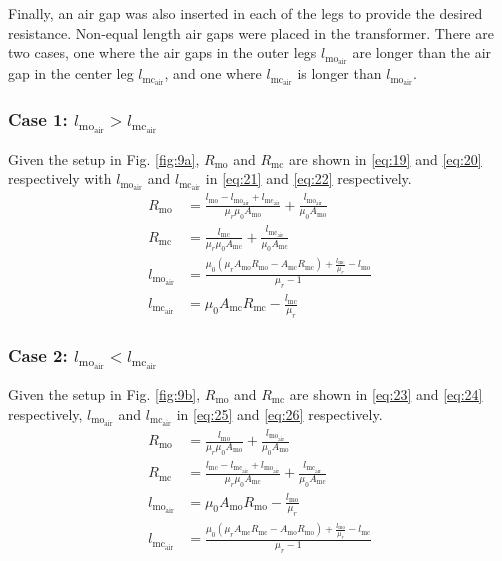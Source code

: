 \documentclass[lettersize,journal]{IEEEtran}
\begin{document}
Finally, an air gap was also inserted in each of the legs to provide the desired resistance. Non-equal length air gaps were placed in the transformer. There are two cases, one where the air gaps in the outer legs $l_{\mathrm{mo}_{\mathrm{air}}}$ are longer than the air gap in the center leg $l_{\mathrm{mc}_{\mathrm{air}}}$, and one where $l_{\mathrm{mc}_{\mathrm{air}}}$ is longer than $l_{\mathrm{mo}_{\mathrm{air}}}$.

\subsubsection*{\textup{Case 1: $l_{\mathrm{mo}_{\mathrm{air}}} > l_{\mathrm{mc}_{\mathrm{air}}}$}}
Given the setup in Fig. \ref{fig:9a}, $R_{\mathrm{mo}}$ and $R_{\mathrm{mc}}$ are shown in \eqref{eq:19} and \eqref{eq:20} respectively with $l_{\mathrm{mo}_{\mathrm{air}}}$ and $l_{\mathrm{mc}_{\mathrm{air}}}$ in \eqref{eq:21} and \eqref{eq:22} respectively.  
\begin{align}
R_{\mathrm{mo}} &= \frac{l_{\mathrm{mo}} - l_{\mathrm{mo}_{\mathrm{air}}} + l_{\mathrm{mc}_{\mathrm{air}}}}{\mu_r \mu_0 A_{\mathrm{mo}}} + \frac{l_{\mathrm{mo}_{\mathrm{air}}}}{\mu_0 A_{\mathrm{mo}}} \label{eq:19}\\
R_{\mathrm{mc}} &= \frac{l_{\mathrm{mc}}}{\mu_r \mu_0 A_{\mathrm{mc}}} + \frac{l_{\mathrm{mc}_{\mathrm{air}}}}{\mu_0 A_{\mathrm{mc}}} \label{eq:20}\\
l_{\mathrm{mo}_{\mathrm{air}}} &= \frac{\mu_0 (\mu_r A_{\mathrm{mo}} R_{\mathrm{mo}} - A_{\mathrm{mc}} R_{\mathrm{mc}}) + \frac{l_{\mathrm{mc}}}{\mu_r} - l_{\mathrm{mo}}}{\mu_r - 1} \label{eq:21}\\
l_{\mathrm{mc}_{\mathrm{air}}} &= \mu_0 A_{\mathrm{mc}} R_{\mathrm{mc}} - \frac{l_{\mathrm{mc}}}{\mu_r} \label{eq:22}
\end{align}

\subsubsection*{\textup{Case 2: $l_{\mathrm{mo}_{\mathrm{air}}} < l_{\mathrm{mc}_{\mathrm{air}}}$}}
Given the setup in Fig. \ref{fig:9b}, $R_{\mathrm{mo}}$ and $R_{\mathrm{mc}}$ are shown in \eqref{eq:23} and \eqref{eq:24} respectively, $l_{\mathrm{mo}_{\mathrm{air}}}$ and $l_{\mathrm{mc}_{\mathrm{air}}}$ in \eqref{eq:25} and \eqref{eq:26} respectively.
\begin{align}
R_{\mathrm{mo}} &= \frac{l_{\mathrm{mo}}}{\mu_r \mu_0 A_{\mathrm{mo}}} + \frac{l_{\mathrm{mo}_{\mathrm{air}}}}{\mu_0 A_{\mathrm{mo}}} \label{eq:23}\\
R_{\mathrm{mc}} &= \frac{l_{\mathrm{mc}} - l_{\mathrm{mc}_{\mathrm{air}}} + l_{\mathrm{mo}_{\mathrm{air}}}}{\mu_r \mu_0 A_{\mathrm{mc}}} + \frac{l_{\mathrm{mc}_{\mathrm{air}}}}{\mu_0 A_{\mathrm{mc}}} \label{eq:24}\\
l_{\mathrm{mo}_{\mathrm{air}}} &= \mu_0 A_{\mathrm{mo}} R_{\mathrm{mo}} - \frac{l_{\mathrm{mo}}}{\mu_r} \label{eq:25}\\
l_{\mathrm{mc}_{\mathrm{air}}} &= \frac{\mu_0 (\mu_r A_{\mathrm{mc}} R_{\mathrm{mc}} - A_{\mathrm{mo}} R_{\mathrm{mo}}) + \frac{l_{\mathrm{mo}}}{\mu_r} - l_{\mathrm{mc}}}{\mu_r - 1} \label{eq:26}
\end{align}
\end{document}
